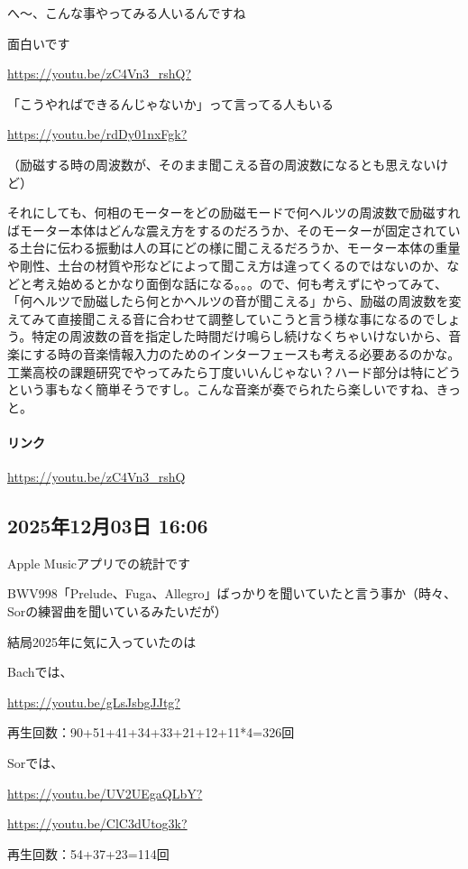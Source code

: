 へ〜、こんな事やってみる人いるんですね

面白いです

\url{https://youtu.be/zC4Vn3_rshQ?}

「こうやればできるんじゃないか」って言ってる人もいる

\url{https://youtu.be/rdDy01nxFgk?}

（励磁する時の周波数が、そのまま聞こえる音の周波数になるとも思えないけど）

それにしても、何相のモーターをどの励磁モードで何ヘルツの周波数で励磁すればモーター本体はどんな震え方をするのだろうか、そのモーターが固定されている土台に伝わる振動は人の耳にどの様に聞こえるだろうか、モーター本体の重量や剛性、土台の材質や形などによって聞こえ方は違ってくるのではないのか、などと考え始めるとかなり面倒な話になる。。。ので、何も考えずにやってみて、「何ヘルツで励磁したら何とかヘルツの音が聞こえる」から、励磁の周波数を変えてみて直接聞こえる音に合わせて調整していこうと言う様な事になるのでしょう。特定の周波数の音を指定した時間だけ鳴らし続けなくちゃいけないから、音楽にする時の音楽情報入力のためのインターフェースも考える必要あるのかな。工業高校の課題研究でやってみたら丁度いいんじゃない？ハード部分は特にどうという事もなく簡単そうですし。こんな音楽が奏でられたら楽しいですね、きっと。

\paragraph{リンク}
\url{https://youtu.be/zC4Vn3_rshQ}

\subsection*{2025年12月03日 16:06}

Apple Musicアプリでの統計です

BWV998「Prelude、Fuga、Allegro」ばっかりを聞いていたと言う事か（時々、Sorの練習曲を聞いているみたいだが）

結局2025年に気に入っていたのは

Bachでは、

\url{https://youtu.be/gLsJsbgJJtg?}

再生回数：90+51+41+34+33+21+12+11*4=326回

Sorでは、

\url{https://youtu.be/UV2UEgaQLbY?}

\url{https://youtu.be/ClC3dUtog3k?}

再生回数：54+37+23=114回

